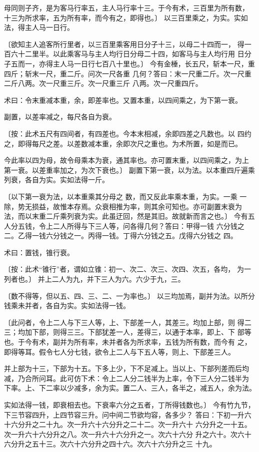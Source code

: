 \documentclass[a4paper,12pt,UTF8,twoside]{ctexbook}
\begin{document}
母同则子齐，是为客马行率五，主人马行率十三。于今有术，三百里为所有数， 十三为所求率，五为所有率，而今有之，即得也。〕 以三百里乘之，为实。实如法，得主人马一日行。

〔欲知主人追客所行里者，以三百里乘客用日分子十三，以母二十四而一， 得一百六十二里半。以此乘客马与主人均行日分母二十四，如客马与主人均行用 日分子五而一，亦得主人马一日行七百八十里也。〕 今有金棰，长五尺，斩本一尺，重四斤；斩末一尺，重二斤。问次一尺各重 几何？答曰：末一尺重二斤。次一尺重二斤八两。次一尺重三斤。次一尺重三斤 八两。次一尺重四斤。

术曰：令末重减本重，余，即差率也。又置本重，以四间乘之，为下第一衰。

副置，以差率减之，每尺各自为衰。

〔按：此术五尺有四间者，有四差也。今本末相减，余即四差之凡数也。以 四约之，即得每尺之差。以差数减本重，余即次尺之重也。为术所置，如是而已。

今此率以四为母，故令母乘本为衰，通其率也。亦可置末重，以四间乘之，为上 第一衰。以差重率加之，为次下衰也。〕 副置下第一衰，以为法。以本重四斤遍乘列衰，各自为实。实如法得一斤。

〔以下第一衰为法，以本重乘其分母之 数，而又反此率乘本重，为实。一乘 一除，势无损益，故惟本存焉。众衰相推为率，则其余可知也。亦可副置末衰为 法，而以末重二斤乘列衰为实。此虽迂回，然是其旧。故就新而言之也。〕 今有五人分五钱，令上二人所得与下三人等，问各得几何？答曰：甲得一钱 六分钱之二。乙得一钱六分钱之一。丙得一钱。丁得六分钱之五。戊得六分钱之 四。

术曰：置钱，锥行衰。

〔按：此术“锥行”者，谓如立锥：初一、次二、次三、次四、次五，各均， 为一列者也。〕 并上二人为九，并下三人为六。六少于九，三。

〔数不得等，但以五、四、三、二、一为率也。〕 以三均加焉，副并为法。以所分钱乘未并者，各自为实。实如法得一钱。

〔此问者，令上二人与下三人等，上、下部差一人，其差三。均加上部，则 得二三；均加下部，则得三三。下部犹差一人，差得三，以通于本率，即上、下 部等也。于今有术，副并为所有率，未并者各为所求率，五钱为所有数，而今有 之，即得等耳。假令七人分七钱，欲令上二人与下五人等，则上、下部差三人。

并上部为十三，下部为十五。下多上少，下不足减上。当以上、下部列差而后均 减，乃合所问耳。此可仿下术：令上二人分二钱半为上率，令下三人分二钱半为 下率。上、下二率以少减多，余为实。置二人、三人，各半之，减五人，余为法。

实如法得一钱，即衰相去也。下衰率六分之五者，丁所得钱数也。〕 今有竹九节，下三节容四升，上四节容三升。问中间二节欲均容，各多少？ 答曰：下初一升六十六分升之二十九。次一升六十六分升之二十二。次一升六十 六分升之一十五。次一升六十六分升之八。次一升六十六分升之一。次六十六分 升之六十。次六十六分升之五十三。次六十六分升之四十六。次六十六分升之三 十九。
\end{document}
